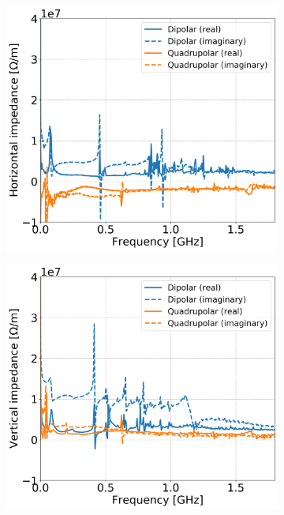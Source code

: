 \begin{figure}[!ht]
    \centering
    \begin{subfigure}[t]{0.45\textwidth}
        \centering
        \includegraphics[width=1\textwidth]{images/Ch7/Q26_complete_SPS_model_impedance_H_plane.png}
    \end{subfigure}
    \hfill
    \begin{subfigure}[t]{0.45\textwidth}
        \centering
        \includegraphics[width=1\textwidth]{images/Ch7/Q26_complete_SPS_model_impedance_V_plane.png}

\end{subfigure}
\end{figure}
